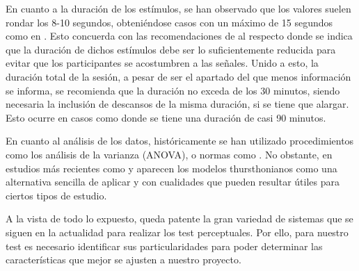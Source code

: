 \documentclass[11pt,a4paper]{book}
\begin{document}
    En cuanto a la duración de los estímulos, se han observado que los valores suelen rondar los 8-10 segundos, obteniéndose casos con un máximo de 15 segundos como en \cite{2005IWitew}. Esto concuerda con las recomendaciones de \cite{UIT1116,UIT1534, UIT1284,EBU3286, UIT1285, UIT1286} al respecto donde se indica que la duración de dichos estímulos debe ser lo suficientemente reducida para evitar que los participantes se acostumbren a las señales. Unido a esto, la duración total de la sesión, a pesar de ser el apartado del que menos información se informa, se recomienda que la duración no exceda de los 30 minutos, siendo necesaria la inclusión de descansos de la misma duración, si se tiene que alargar. Esto ocurre en casos como \cite{2019LKritly} donde se tiene una duración de casi 90 minutos.
    
    En cuanto al análisis de los datos, históricamente se han utilizado procedimientos como los análisis de la varianza (ANOVA), o normas como \cite{ISO10399}. No obstante, en estudios más recientes como \cite{delaPrida2021} y \cite{delaPrida2019} aparecen los modelos thursthonianos como una alternativa sencilla de aplicar y con cualidades que pueden resultar útiles para ciertos tipos de estudio.\newline
    
    A la vista de todo lo expuesto, queda patente la gran variedad de sistemas que se siguen en la actualidad para realizar los test perceptuales. Por ello, para nuestro test es necesario identificar sus particularidades para poder determinar las características que mejor se ajusten a nuestro proyecto.
    
    
    
    
    
    
\end{document}
